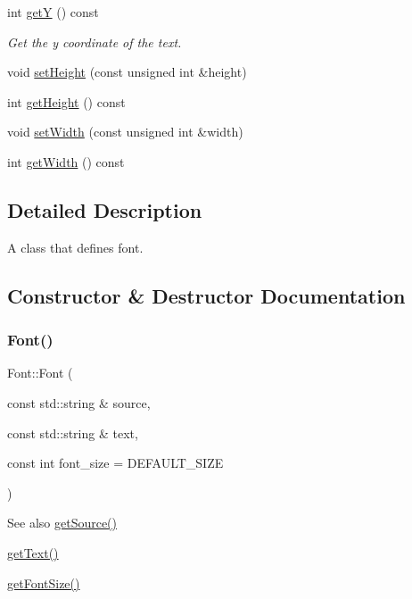 \begin{DoxyCompactItemize}
int \mbox{\hyperlink{class_font_a8701db15b5977fd99f8622505194a27d}{getY}} () const
\begin{DoxyCompactList}\small\item\em Get the y coordinate of the text. \end{DoxyCompactList}\item 
void \mbox{\hyperlink{class_font_adc672745b542873f41cd3e13c3b05da3}{set\+Height}} (const unsigned int \&height)
\item 
int \mbox{\hyperlink{class_font_a2a6d1fe37cc96a265144c958f5492676}{get\+Height}} () const
\item 
void \mbox{\hyperlink{class_font_a97115438619656cb75d5b87636cec75e}{set\+Width}} (const unsigned int \&width)
\item 
int \mbox{\hyperlink{class_font_a9466673d1576043dc7fa7d0bfcc505e0}{get\+Width}} () const
\end{DoxyCompactItemize}


\subsection{Detailed Description}
A class that defines font. 

\subsection{Constructor \& Destructor Documentation}
\mbox{\label{class_font_a6ac2daa50eaf8fa5f58dcdf74ac3b25f}} 
\subsubsection{\texorpdfstring{Font()}{Font()}}
{\footnotesize\ttfamily Font\+::\+Font (\begin{DoxyParamCaption}\item[{const std\+::string \&}]{source,  }\item[{const std\+::string \&}]{text,  }\item[{const int}]{font\+\_\+size = {\ttfamily DEFAULT\+\_\+SIZE} }\end{DoxyParamCaption})}

\begin{DoxySeeAlso}{See also}
\mbox{\hyperlink{class_font_ac6bc1fec3b5df15f0c3e7fcc390921c3}{get\+Source()}} 

\mbox{\hyperlink{class_font_aa98667de37350ff56f3555eef663792c}{get\+Text()}} 

\mbox{\hyperlink{class_font_a18fa6855561c84d79cea757128aabd08}{get\+Font\+Size()}} 
\end{DoxySeeAlso}


